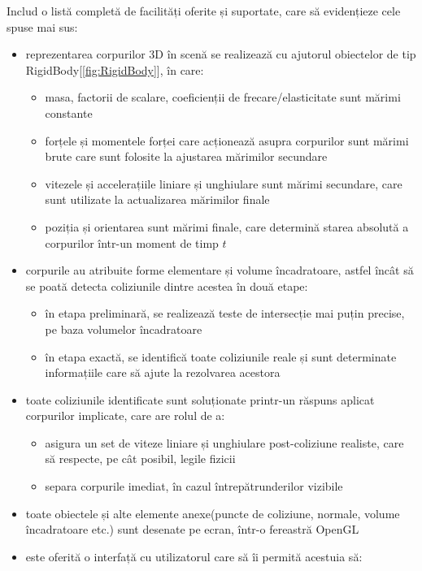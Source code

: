 \documentclass[12pt,a4paper]{report}
\begin{document}
Includ o listă completă de facilități oferite și suportate, care să evidențieze cele spuse mai sus:
\begin{itemize}
	\item reprezentarea corpurilor 3D în scenă se realizează cu ajutorul obiectelor de tip RigidBody[\autoref{fig:RigidBody}], în care:
		\begin{itemize}
			\item masa, factorii de scalare, coeficienții de frecare/elasticitate sunt mărimi constante
			\item forțele și momentele forței care acționează asupra corpurilor sunt mărimi brute care sunt folosite la ajustarea mărimilor secundare
			\item vitezele și accelerațiile liniare și unghiulare sunt mărimi secundare, care sunt utilizate la actualizarea mărimilor finale
			\item poziția și orientarea sunt mărimi finale, care determină starea absolută a corpurilor într-un moment de timp $t$
		\end{itemize}
	\item corpurile au atribuite forme elementare și volume încadratoare, astfel încât să se poată detecta coliziunile dintre acestea în două etape:
		\begin{itemize}
			\item în etapa preliminară, se realizează teste de intersecție mai puțin precise, pe baza volumelor încadratoare
			\item în etapa exactă, se identifică toate coliziunile reale și sunt determinate informațiile care să ajute la rezolvarea acestora
		\end{itemize}
	\item toate coliziunile identificate sunt soluționate printr-un răspuns aplicat corpurilor implicate, care are rolul de a:
		\begin{itemize}
			\item asigura un set de viteze liniare și unghiulare post-coliziune realiste, care să respecte, pe cât posibil, legile fizicii
			\item separa corpurile imediat, în cazul întrepătrunderilor vizibile
		\end{itemize}
	\item toate obiectele și alte elemente anexe(puncte de coliziune, normale, volume încadratoare etc.) sunt desenate pe ecran, într-o fereastră OpenGL
	\item este oferită o interfață cu utilizatorul care să îi permită acestuia să:
		\begin{itemize} 

\end{itemize}
\end{itemize}
\end{document}

